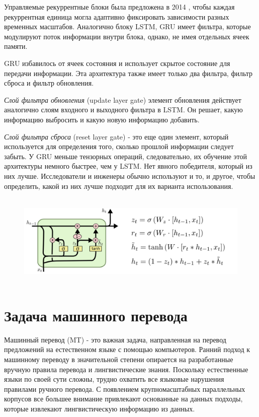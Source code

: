 	Управляемые рекуррентные блоки была предложена в 2014 \cite{3}, чтобы каждая рекуррентная единица могла адаптивно фиксировать зависимости разных временных масштабов. Аналогично блоку LSTM, GRU имеет
	фильтра, которые модулируют поток информации внутри блока, однако, не имея отдельных ячеек памяти.
	
    GRU избавилось от ячеек состояния и использует скрытое состояние для передачи информации. Эта архитектура также имеет только два фильтра, фильтр сброса и фильтр обновления.
    
    \textit{Слой фильтра обновления} (update layer gate) элемент обновления действует аналогично слоям входного и выходного фильтра в LSTM. Он решает, какую информацию выбросить и какую новую информацию добавить.
    
    \textit{Слой фильтра сброса} (reset layer gate) - это еще один элемент, который используется для определения того, сколько прошлой информации следует забыть.
    У GRU меньше тензорных операций, следовательно, их обучение этой архитектуры немного быстрее, чем у LSTM. Нет явного победителя, который из них лучше. Исследователи и инженеры обычно используют и то, и другое, чтобы определить, какой из них лучше подходит для их варианта использования.
    
    \begin{figure}[ht!]
		\centering
		\captionsetup{justification=centering}
		\includegraphics[height=45mm]{img/GRU.png}
	\end{figure}
	
	\clearpage
 	
	\section{Задача машинного перевода}
	
	Машинный перевод (MT) - это важная задача, направленная на перевод предложений на естественном языке с помощью компьютеров. Ранний подход к машинному переводу в значительной степени опирается на разработанные вручную правила перевода и лингвистические знания. Поскольку естественные языки по своей сути сложны, трудно охватить все языковые нарушения правилами ручного перевода. С появлением крупномасштабных параллельных корпусов все большее внимание привлекают основанные на данных подходы, которые извлекают лингвистическую информацию из данных.
	
